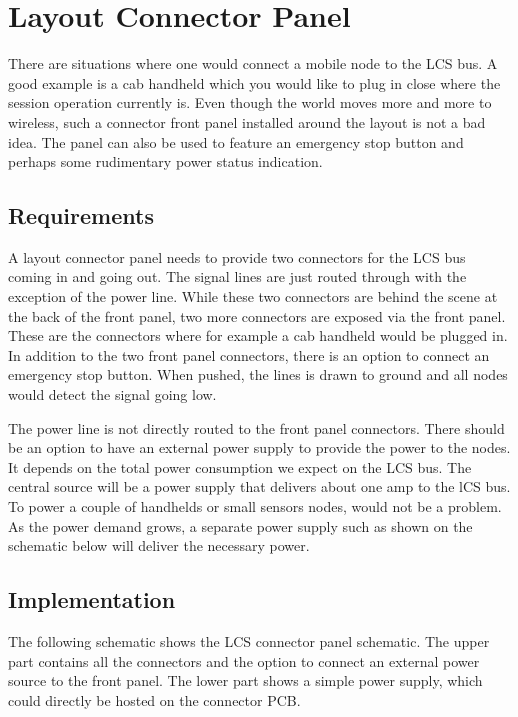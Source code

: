 \chapter{Layout Connector Panel}

There are situations where one would connect a mobile node to the LCS bus. A good example is a cab handheld which you would like to plug in close where the session operation currently is. Even though the world moves more and more to wireless, such a connector front panel installed around the layout is not a bad idea. The panel can also be used to feature an emergency stop button and perhaps some rudimentary power status indication.

\section{Requirements}

A layout connector panel needs to provide two connectors for the LCS bus coming in and going out. The signal lines are just routed through with the exception of the power line. While these two connectors are behind the scene at the back of the front panel, two more connectors are exposed via the front panel. These are the connectors where for example a cab handheld would be plugged in. In addition to the two front panel connectors, there is an option to connect an emergency stop button. When pushed, the lines is drawn to ground and all nodes would detect the signal going low.

The power line is not directly routed to the front panel connectors. There should be an option to have an external power supply to provide the power to the nodes. It depends on the total power consumption we expect on the LCS bus. The central source will be a power supply that delivers about one amp to the lCS bus. To power a couple of handhelds or small sensors nodes, would not be a problem. As the power demand grows, a separate power supply such as shown on the schematic below will deliver the necessary power.

\section{Implementation}

The following schematic shows the LCS connector panel schematic. The upper part contains all the connectors and the option to connect an external power source to the front panel. The lower part shows a simple power supply, which could directly be hosted on the connector PCB.

